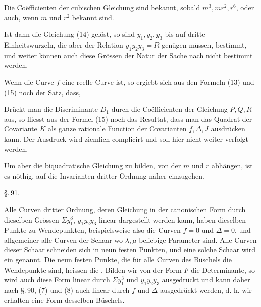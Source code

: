 
Die Co\"efficienten der cubischen Gleichung sind bekannt, sobald $m^3, mr^2, r^6$, oder auch, wenn $m$ und $r^2$ bekannt sind.

Ist dann die Gleichung (14) gelöst, so sind $y_1,y_2,y_3$ bis auf dritte Einheitswurzeln, die aber der Relation $y_1y_2y_3=R$ genügen müssen, bestimmt, und weiter können auch diese Grössen der Natur der Sache nach nicht bestimmt werden.

Wenn die Curve $f$ eine reelle Curve ist, so ergiebt sich aus den Formeln (13) und (15) noch der Satz, dass, 

Drückt man die Discriminante $D_1$ durch die Coëfficienten der Gleichung $P,Q,R$ aus, so fliesst aus der Formel (15) noch das Resultat, dass man das Quadrat der Covariante $K$ als ganze rationale Function der Covarianten $f,\Delta,J$ ausdrücken kann. Der Ausdruck wird ziemlich complicirt und soll hier nicht weiter verfolgt werden.

Um aber die biquadratische Gleichung zu bilden, von der $m$ und $r$ abhängen, ist es n\"othig, auf die Invarianten dritter Ordnung näher einzugehen.

\begin{center}
\S.\,91.

\end{center}

Alle Curven dritter Ordnung, deren Gleichung in der canonischen Form durch dieselben Grössen $\Sigma y_1^3$, $y_1y_2y_3$ linear dargestellt werden kann, haben dieselben Punkte zu Wendepunkten, beispielsweise also die Curven $f=0$ und $\Delta=0$, und allgemeiner alle Curven der Schaar
wo $\lambda,\mu$ beliebige Parameter sind. Alle Curven dieser Schaar schneiden sich in neun festen Punkten, und eine solche Schaar wird ein  genannt. Die neun festen Punkte, die für alle Curven des Büschels die Wendepunkte sind, heissen die . Bilden wir von der Form $F$ die  Determinante, so wird auch diese Form linear durch $\Sigma y_1^3$ und $y_1y_2y_3$ ausgedrückt und kann daher nach \S.\,90, (7) und (8) auch linear durch $f$ und $\Delta$ ausgedrückt werden, d. h. wir erhalten eine Form desselben Büschels.

